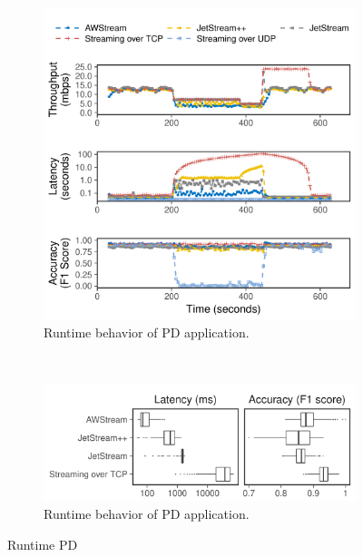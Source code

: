 \begin{figure}
  \begin{subfigure}[t]{\columnwidth}
    \centering
    \includegraphics[width=\columnwidth]{figures/runtime_mot-timeseries.pdf}
    \caption{Runtime behavior of PD application.}
    \label{fig:pd-runtime-timeseries}
  \end{subfigure}
  \vspace{1em}
  \\
  \begin{subfigure}[t]{\columnwidth}
    \centering
    \includegraphics[width=\columnwidth]{figures/runtime_mot-boxplot.pdf}
    \caption{Runtime behavior of PD application.}
    \label{fig:pd-runtime-boxplot}
  \end{subfigure}
  \caption{Runtime PD}
  \label{fig:pd-runtime}
\end{figure}

